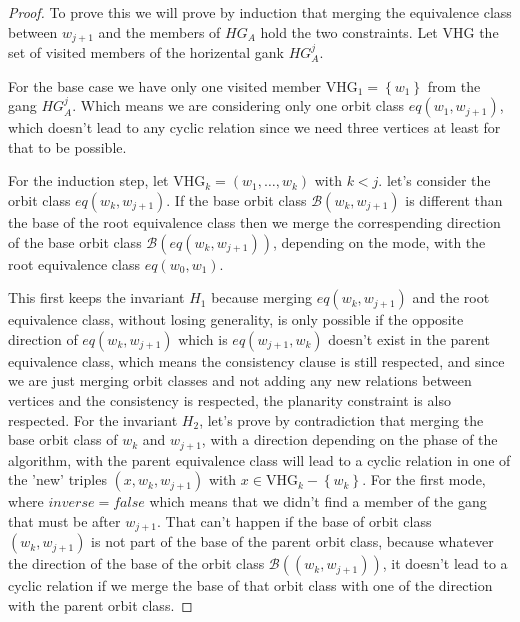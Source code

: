 \begin{proof}

    To prove this we will prove by induction that merging the equivalence class between $w_{j+1}$ and the members of $HG_{A}$ hold the two
    constraints. 
    Let $\mathrm{VHG}$ the set of visited members of the horizental gank $HG_{A}^j$.

    For the base case we have only one visited member $\mathrm{VHG}_1 = \left\{w_1\right\}$ from the gang $HG_{A}^j$.
    Which means we are considering only one orbit class $eq\left( w_1, w_{j+1} \right)$, which doesn't lead to any cyclic 
    relation since we need three vertices at least for that to be possible.

    For the induction step, let $\mathrm{VHG}_k = \left( w_1, \ldots, w_k \right) $  with $k < j$. 
    let's consider the orbit class $eq\left( w_k, w_{j+1} \right)$. If the base orbit class $\mathcal{B}\left( w_k, w_{j+1} \right)$ is 
    different than the base of the root equivalence class then we merge the correspending direction 
    of the base orbit class $\mathcal{B}\left(eq\left( w_k, w_{j+1} \right)\right)$, depending 
    on the mode, with the root equivalence class $eq\left( w_0, w_1 \right)$. 

    This first keeps the invariant $H_1$ because merging $eq\left( w_k, w_{j+1} \right)$  and 
    the root equivalence class, without losing generality, is only possible if the opposite direction of $eq\left( w_k, w_{j+1} \right)$ which is 
    $eq\left( w_{j+1}, w_k \right)$ doesn't exist in the parent equivalence class, which means the consistency clause is still respected, and 
    since we are just merging orbit classes and not adding any new relations between vertices and the consistency is respected, the planarity constraint is also respected.
    For the invariant $H_2$, let's prove by contradiction that merging the base orbit class of $w_k$ and $w_{j+1}$, with 
    a direction depending on the phase of the algorithm, with the parent equivalence class will lead to a cyclic relation in one of the 'new' triples 
    $\left( x, w_k, w_{j+1} \right)$ with $x \in \mathrm{VHG}_k - \left\{w_k\right\}$. For the first mode, where $inverse=false$ which means 
    that we didn't find a member of the gang that must be after $w_{j+1}$. That can't happen if the base of orbit class  $\left( w_k, w_{j+1} \right)$ 
    is not part of the base of the parent orbit class, because whatever the direction of the base of the orbit class $\mathcal{B}\left(\left( w_k, w_{j+1} \right)\right)$, 
    it doesn't lead to a cyclic relation if we merge the base of that orbit class with one of the direction with the parent orbit class.


\end{proof}
